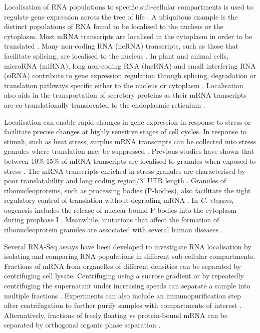 \documentclass[../main.tex]{subfiles}
\begin{document}
Localisation of RNA populations to specific sub-cellular compartments is used to regulate gene expression across the tree of life \parencite{Das2021}.
A ubiquitous example is the distinct populations of RNA found to be localised to the nucleus or the cytoplasm. 
Most mRNA transcripts are localised in the cytoplasm in order to be translated \parencite{Kohler2007}.
Many non-coding RNA (ncRNA) transcripts, such as those that facilitate splicing, are localised to the nucleus \parencite{Will2011}. 
In plant and animal cells, microRNA (miRNA), long non-coding RNA (lncRNA) and small interfering RNA (siRNA) contribute to gene expression regulation through splicing, degradation or translation pathways specific either to the nucleus or cytoplasm \parencite{Hombach2016}.
Localisation also aids in the transportation of secretory proteins as their mRNA transcripts are co-translationally translocated to the endoplasmic reticulum \parencite{Jan2014}.

Localisation can enable rapid changes in gene expression in response to stress or facilitate precise changes at highly sensitive stages of cell cycles.
In response to stimuli, such as heat stress, surplus mRNA transcripts can be collected into stress granules where translation may be suppressed \parencite{Anderson2009}. 
Previous studies have shown that between 10\%-15\% of mRNA transcripts are localised to granules when exposed to stress \parencite{VanTreeck2018,Khong2017}.
The mRNA transcripts enriched in stress granules are characterised by poor translatability and long coding region/3' UTR length \parencite{Khong2017}.
Granules of ribonucleoproteins, such as processing bodies (P-bodies), also facilitate the tight regulatory control of translation without degrading mRNA \parencite{Buchan2014}.
In \textit{C. elegans}, oogenesis includes the release of nuclear-bound P-bodies into the cytoplasm during prophase I \parencite{Voronina2011}.
Meanwhile, mutations that affect the formation of ribonucleoprotein granules are associated with several human diseases \parencite{Mackenzie2017}. 

Several RNA-Seq assays have been developed to investigate RNA localisation by isolating and comparing RNA populations in different sub-cellular compartments.
Fractions of mRNA from organelles of different densities can be separated by centrifuging cell lysate. 
Centrifuging using a sucrose gradient or by repeatedly centrifuging the supernatant under increasing speeds can separate a sample into multiple fractions \parencite{Iserman2020, Dunham2012, Hu2017}.
Experiments can also include an immunopurification step after centrifugation to further purify samples with compartments of interest \parencite{Khong2017}.
Alternatively, fractions of freely floating vs protein-bound mRNA can be separated by orthogonal organic phase separation \parencite{Queiroz2019}. 
\end{document}
